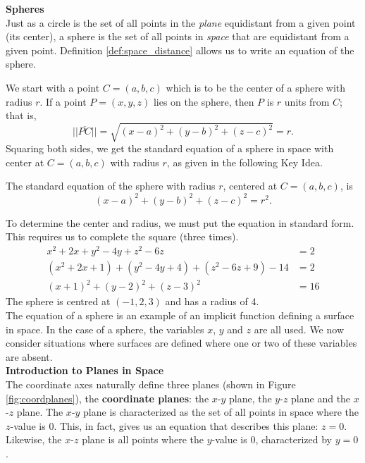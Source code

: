 \noindent\textbf{\large Spheres}\\

Just as a circle is the set of all points in the \textit{plane} equidistant from a given point (its center), a sphere is the set of all points in \textit{space} that are equidistant from a given point. Definition \ref{def:space_distance} allows us to write an equation of the sphere.

We start with a point $C = (a,b,c)$ which is to be the center of a sphere with radius $r$. If a point $P=(x,y,z)$ lies on the sphere, then $P$ is $r$ units from $C$; that is, 
$$||\overline{PC}|| = \sqrt{(x-a)^2+(y-b)^2+(z-c)^2} = r.$$
Squaring both sides, we get the standard equation of a sphere in space with center at $C=(a,b,c)$ with radius $r$, as given in the following Key Idea.

{The standard equation of the sphere with radius $r$, centered at $C=(a,b,c)$, is
$$(x-a)^2+(y-b)^2+(z-c)^2=r^2.$$
}

{To determine the center and radius, we must put the equation in standard form. This requires us to complete the square (three times).
\begin{align*}
x^2+2x+y^2-4y+z^2-6z&=2 \\
(x^2+2x+1) + (y^2-4y+4)+ (z^2-6z+9) - 14 &= 2\\
(x+1)^2 + (y-2)^2 + (z-3)^2 &= 16
\end{align*}
The sphere is centred at $(-1,2,3)$ and has a radius of 4.
}\\

The equation of a sphere is an example of an implicit function defining a surface in space. In the case of a sphere, the variables $x$, $y$ and $z$ are all used. We now consider situations where surfaces are defined where one or two of these variables are absent.\\

\noindent\textbf{\large Introduction to Planes in Space}\\

The coordinate axes naturally define three planes (shown in Figure \ref{fig:coordplanes}), the \textbf{coordinate planes}: the $x$-$y$ plane, the $y$-$z$ plane and the $x$-$z$ plane. The $x$-$y$ plane is characterized as the set of all points in space where the $z$-value is 0. %
This, in fact, gives us an equation that describes this plane: $z=0$. Likewise, the $x$-$z$ plane is all points where the $y$-value is 0, characterized by $y=0$.\\

